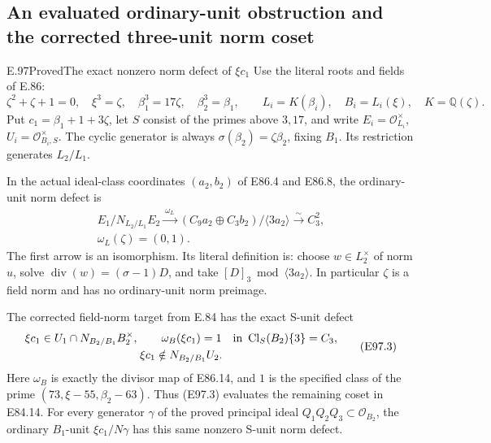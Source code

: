 \subsection{An evaluated ordinary-unit obstruction and the corrected three-unit norm coset}

\begin{statement}{E.97}{Proved}{The exact nonzero norm defect of \(\xi c_1\)}
Use the literal roots and fields of E.86:
\[
 \zeta^2+\zeta+1=0,\quad \xi^3=\zeta,\quad
 \beta_1^3=17\zeta,\quad \beta_2^3=\beta_1,\qquad
 L_i=K(\beta_i),\quad B_i=L_i(\xi),\quad K=\mathbb Q(\zeta).
 \tag{E97.1}
\]
Put \(c_1=\beta_1+1+3\zeta\), let \(S\) consist of the primes
above \(3,17\), and write \(E_i=\mathcal O_{L_i}^{\times}\),
\(U_i=\mathcal O_{B_i,S}^{\times}\).
The cyclic generator is always
\(\sigma(\beta_2)=\zeta\beta_2\), fixing \(B_1\).
Its restriction generates \(L_2/L_1\).

In the actual ideal-class coordinates \((a_2,b_2)\) of E86.4
and E86.8, the ordinary-unit norm defect is
\[
 \begin{gathered}
 E_1/N_{L_2/L_1}E_2\xrightarrow{\ \omega_L\ }
 (C_9a_2\oplus C_3b_2)/\langle3a_2\rangle
       \xrightarrow{\sim} C_3^2,\\
 \omega_L(\zeta)=(0,1).
 \end{gathered}
 \tag{E97.2}
\]
The first arrow is an isomorphism. Its literal definition is:
choose \(w\in L_2^\times\) of norm \(u\), solve
\(\operatorname{div}(w)=(\sigma-1)D\), and take
\([D]_3\bmod\langle3a_2\rangle\).
In particular \(\zeta\) is a field norm and has no ordinary-unit
norm preimage.

The corrected field-norm target from E.84 has the exact
S-unit defect
\[
 \begin{gathered}
 \xi c_1\in U_1\cap N_{B_2/B_1}B_2^\times,\qquad
 \omega_B(\xi c_1)=1
      \quad\hbox{in }\operatorname{Cl}_S(B_2)\{3\}=C_3,\\
 \xi c_1\notin N_{B_2/B_1}U_2.
 \end{gathered}
 \tag{E97.3}
\]
Here \(\omega_B\) is exactly the divisor map of E86.14,
and \(1\) is the specified class of the prime
\((73,\xi-55,\beta_2-63)\).
Thus (E97.3) evaluates the remaining coset in E84.14.
For every generator \(\gamma\) of the proved principal ideal
\(Q_1Q_2Q_3\subset\mathcal O_{B_2}\), the ordinary \(B_1\)-unit
\(\xi c_1/N\gamma\) has this same nonzero S-unit norm defect.


\end{statement}
